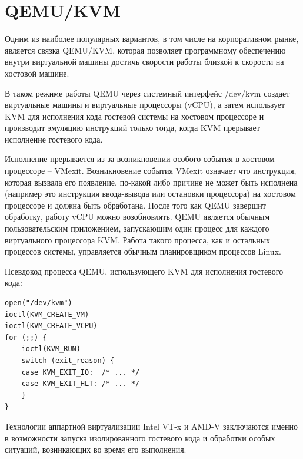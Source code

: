 \documentclass{mipt-thesis-bs}
\begin{document}
\section*{QEMU/KVM}

Одним из наиболее популярных вариантов, в том числе на корпоративном рынке, является связка QEMU/KVM, которая позволяет программному обеспечению внутри виртуальной машины достичь скорости работы близкой к скорости на хостовой машине.

В таком режиме работы QEMU через системный интерфейс /dev/kvm создает виртуальные машины и виртуальные процессоры (vCPU), а затем использует KVM для исполнения кода гостевой системы на хостовом процессоре и производит эмуляцию инструкций только тогда, когда KVM прерывает исполнение гостевого кода\cite{qemu-kvm-arch}.

Исполнение прерывается из-за возникновении особого события в хостовом процессоре -- VMexit. Возникновение события VMexit означает что инструкция, которая вызвала его появление, по-какой либо причине не может быть исполнена (например это инструкция ввода-вывода или остановки процессора) на хостовом процессоре и должна быть обработана\cite{im}. После того как QEMU завершит обработку, работу vCPU можно возобновлять. QEMU является обычным пользовательским приложением, запускающим один процесс для каждого виртуального процессора KVM. Работа такого процесса, как и остальных процессов системы, управляется обычным планировщиком процессов Linux\cite{qemu-kvm-arch}.

Псевдокод процесса QEMU, использующего KVM для исполнения гостевого кода:
\begin{verbatim}
open("/dev/kvm")
ioctl(KVM_CREATE_VM)
ioctl(KVM_CREATE_VCPU)
for (;;) {
    ioctl(KVM_RUN)
    switch (exit_reason) {
    case KVM_EXIT_IO:  /* ... */
    case KVM_EXIT_HLT: /* ... */
    }
}
\end{verbatim}

Технологии аппартной виртуализации Intel VT-x и AMD-V заключаются именно в возможности запуска изолированного гостевого кода и обработки особых ситуаций, возникающих во время его выполнения.
\end{document}
